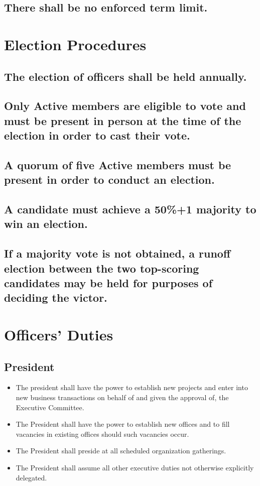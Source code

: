 \documentclass[letter]{report}
\begin{document}
\subsection{There shall be no enforced term limit.}
\section{Election Procedures}
\subsection{The election of officers shall be held annually.}
\subsection{Only Active members are eligible to vote and must be present in person at the time of the election in order to cast their vote.}
\subsection{A quorum of five Active members must be present in order to conduct an election.}
\subsection{A candidate must achieve a 50\%+1 majority to win an election.}
\subsection{If a majority vote is not obtained, a runoff election between the two top-scoring candidates may be held for purposes of deciding the victor.}
\section{Officers' Duties}
\subsection{President}
\begin{itemize}
\item The president shall have the power to establish new projects and enter into new business transactions on behalf of and given the approval of, the Executive Committee.
\item The President shall have the power to establish new offices and to fill vacancies in existing offices should such vacancies occur.
\item The President shall preside at all scheduled organization gatherings.
\item The President shall assume all other executive duties not otherwise explicitly delegated.
\end{itemize}
\end{document}
